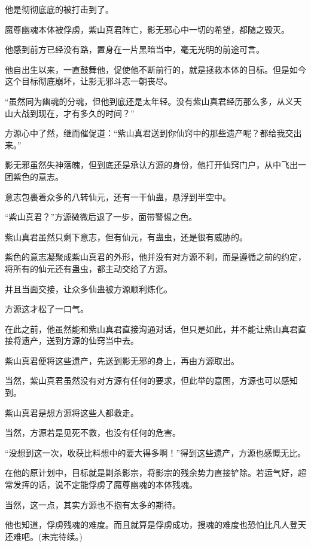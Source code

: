 \begin{this_body}
他是彻彻底底的被打击到了。

魔尊幽魂本体被俘虏，紫山真君阵亡，影无邪心中一切的希望，都随之毁灭。

他感到前方已经没有路，置身在一片黑暗当中，毫无光明的前途可言。

他自出生以来，一直鼓舞他，促使他不断前行的，就是拯救本体的目标。但是如今这个目标彻底崩坏，让影无邪斗志一朝丧尽。

“虽然同为幽魂的分魂，但他到底还是太年轻。没有紫山真君经历那么多，从义天山大战到现在，才有多久的时间？”

方源心中了然，继而催促道：“紫山真君送到你仙窍中的那些遗产呢？都给我交出来。”

影无邪虽然失神落魄，但到底还是承认方源的身份，他打开仙窍门户，从中飞出一团紫色的意志。

意志包裹着众多的八转仙元，还有一干仙蛊，悬浮到半空中。

“紫山真君？”方源微微后退了一步，面带警惕之色。

紫山真君虽然只剩下意志，但有仙元，有蛊虫，还是很有威胁的。

紫色的意志凝聚成紫山真君的外形，他并没有对方源不利，而是遵循之前的约定，将所有的仙元还有蛊虫，都主动交给了方源。

并且当面交接，让众多仙蛊被方源顺利炼化。

方源这才松了一口气。

在此之前，他虽然能和紫山真君直接沟通对话，但只是如此，并不能让紫山真君直接将遗产，送到方源的仙窍当中去。

紫山真君便将这些遗产，先送到影无邪的身上，再由方源取出。

当然，紫山真君虽然没有对方源有任何的要求，但此举的意图，方源也可以感知到。

紫山真君是想方源将这些人都救走。

当然，方源若是见死不救，也没有任何的危害。

“没想到这一次，收获比料想中的要大得多啊！”得到这些遗产，方源也感慨无比。

在他的原计划中，目标就是剿杀影宗，将影宗的残余势力直接铲除。若运气好，超常发挥的话，说不定能俘虏了魔尊幽魂的本体残魂。

当然，这一点，其实方源也不抱有太多的期待。

他也知道，俘虏残魂的难度。而且就算是俘虏成功，搜魂的难度也恐怕比凡人登天还难吧。(未完待续。)

\end{this_body}

